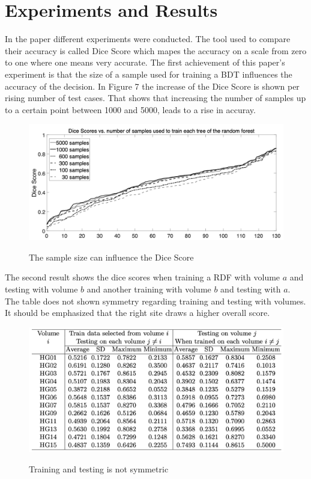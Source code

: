 \documentclass[
12pt,
headsepline,
bibliography=totoc,
twoside=semi,
fleqn
]{scrartcl}
\begin{document}
\section{Experiments and Results\label{sec:sec4}}

 In the paper different experiments were conducted. The tool used to compare their accuracy is called Dice Score which mapes the accuracy on a scale from zero to one where one means very accurate. 
 The first achievement of this paper's experiment is that the size of a sample used for training a BDT influences the accuracy of the decision. In Figure 7 the increase of the Dice Score is shown per rising number of test cases. That shows that increasing the number of samples up to a certain point between 1000 and 5000, leads to a rise in accuray.
 
 \begin{figure}[H]
 \centering \includegraphics[scale=0.5]{BDT16.png}\label{fig:test}
 \caption{The sample size can influence the Dice Score}
 \end{figure} 

 The second result shows the dice scores when training a RDF with volume $a$ and testing with volume $b$ and another training with volume $b$ and testing with $a$. The table does not shown symmetry regarding training and testing with volumes. It should be emphasized that the right site draws a higher overall score. 

 \begin{figure}[H]
 \centering \includegraphics[scale=0.55]{BDT17.png}\label{fig:fig17}
 \caption{Training and testing is not symmetric}
 \end{figure} 
\end{document}
